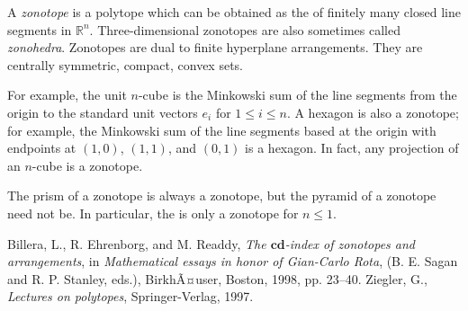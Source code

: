 \documentclass[12pt]{article}
\begin{document}
A \emph{zonotope} is a polytope which can be obtained as the
 of finitely many 
closed line segments in $\mathbb{R}^n$.  Three-dimensional zonotopes are also sometimes called \emph{zonohedra}.  Zonotopes are dual to finite hyperplane arrangements.  They are centrally symmetric, compact, convex sets.

For example, the unit $n$-cube is the Minkowski sum of
the line segments from the origin to the standard unit vectors $e_i$ 
for $1\le i\le n$.  
A hexagon is also a zonotope; for example, the Minkowski 
sum of the line segments based at the origin with endpoints at $(1,0)$, $(1,1)$, and $(0,1)$ is a hexagon.  In fact, any projection of an $n$-cube is a zonotope.

The prism of a zonotope is always a zonotope, but the pyramid of a 
zonotope need not be.  In particular, the 
 is only a
zonotope for $n\le 1$.

\begin{thebibliography}{9}
Billera, L., R. Ehrenborg, and M. Readdy, \emph{The $\mathbf{cd}$-index of zonotopes and arrangements}, in \emph{Mathematical essays in honor of Gian-Carlo Rota}, (B. E. Sagan and R. P. Stanley, eds.), BirkhÃ¤user, Boston, 1998, pp. 23--40.
Ziegler, G., \emph{Lectures on polytopes}, Springer-Verlag, 1997.
\end{thebibliography}
\end{document}
